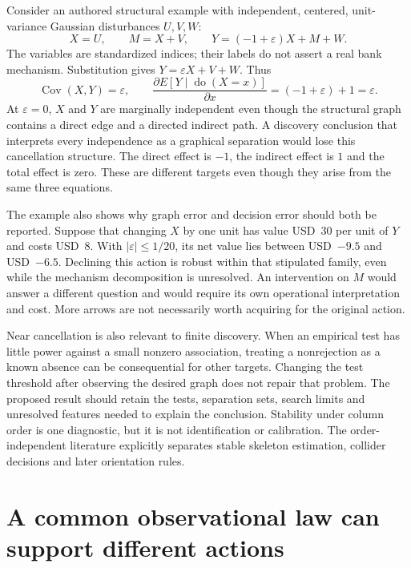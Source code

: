 Consider an authored structural example with independent, centered,
unit-variance Gaussian disturbances $U,V,W$:
\[
 X=U,\qquad M=X+V,\qquad
 Y=(-1+\varepsilon)X+M+W.
\]
The variables are standardized indices; their labels do not assert a real
bank mechanism. Substitution gives $Y=\varepsilon X+V+W$. Thus
\[
 \operatorname{Cov}(X,Y)=\varepsilon,
 \qquad \frac{\partial E[Y\mid\operatorname{do}(X=x)]}{\partial x}
 =(-1+\varepsilon)+1=\varepsilon.
\]
At $\varepsilon=0$, $X$ and $Y$ are marginally independent even though the
structural graph contains a direct edge and a directed indirect path. A
discovery conclusion that interprets every independence as a graphical
separation would lose this cancellation structure. The direct effect is
$-1$, the indirect effect is $1$ and the total effect is zero. These are
different targets even though they arise from the same three equations.
\citep{exec16_s2_exact}

The example also shows why graph error and decision error should both be
reported. Suppose that changing $X$ by one unit has value USD~30 per unit of
$Y$ and costs USD~8. With $|\varepsilon|\leq 1/20$, its net value lies between
USD~$-9.5$ and USD~$-6.5$. Declining this action is robust within that
stipulated family, even while the mechanism decomposition is unresolved.
An intervention on $M$ would answer a different question and would require
its own operational interpretation and cost. More arrows are not necessarily
worth acquiring for the original action. \citep{exec16_s2_exact}

Near cancellation is also relevant to finite discovery. When an empirical
test has little power against a small nonzero association, treating a
nonrejection as a known absence can be consequential for other targets.
Changing the test threshold after observing the desired graph does not repair
that problem. The proposed result should retain the tests, separation sets,
search limits and unresolved features needed to explain the conclusion.
Stability under column order is one diagnostic, but it is not identification
or calibration. The order-independent literature explicitly separates stable
skeleton estimation, collider decisions and later orientation rules.
\citep{exec13_latentr_colombo2014,exec13_pydisc_causallearn}

\section{A common observational law can support different actions}


